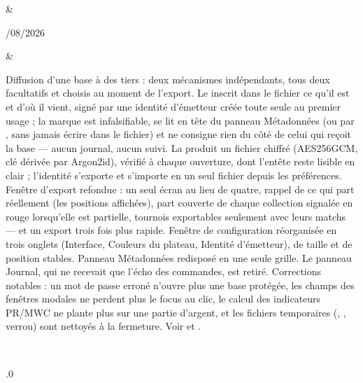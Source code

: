 \documentclass[letterpaper,10pt,french]{sphinxmanual}
\begin{document}
\begin{savenotes}
\begin{longtable}{}
&\begin{varwidth}[t]{}
/08/2026
\sphinxbeforeendvarwidth
\end{varwidth}%
&\begin{varwidth}[t]{}
\sphinxAtStartPar
Diffusion d’une base à des tiers : deux mécanismes indépendants, tous deux facultatifs et choisis au moment de l’export. Le  inscrit dans le fichier ce qu’il est et d’où il vient, signé par une identité d’émetteur créée toute seule au premier usage ; la marque est infalsifiable, se lit en tête du panneau Métadonnées (ou par , sans jamais écrire dans le fichier) et ne consigne rien du côté de celui qui reçoit la base — aucun journal, aucun suivi. La  produit un fichier  chiffré (AES\sphinxhyphen{}256\sphinxhyphen{}GCM, clé dérivée par Argon2id), vérifié à chaque ouverture, dont l’en\sphinxhyphen{}tête reste lisible en clair ; l’identité s’exporte et s’importe en un seul fichier depuis les préférences. Fenêtre d’export refondue : un seul écran au lieu de quatre, rappel de ce qui part réellement (les positions affichées), part couverte de chaque collection signalée en rouge lorsqu’elle est partielle, tournois exportables seulement avec leurs matchs — et un export trois fois plus rapide. Fenêtre de configuration réorganisée en trois onglets (Interface, Couleurs du plateau, Identité d’émetteur), de taille et de position stables. Panneau Métadonnées redisposé en une seule grille. Le panneau Journal, qui ne recevait que l’écho des commandes, est retiré. Corrections notables : un mot de passe erroné n’ouvre plus une base protégée, les champs des fenêtres modales ne perdent plus le focus au clic, le calcul des indicateurs PR/MWC ne plante plus sur une partie d’argent, et les fichiers temporaires (, , verrou) sont nettoyés à la fermeture. Voir {\hyperref[\detokenize{manuel:diffusion-controlee}]{}} et {\hyperref[\detokenize{manuel:manuel}]{}}.
\sphinxbeforeendvarwidth
\end{varwidth}%
\\
\sphinxhline\begin{varwidth}[t]{}
.0

\end{varwidth}
\end{longtable}
\end{savenotes}
\end{document}
